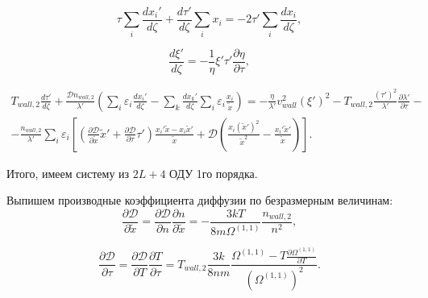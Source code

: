 \documentclass[12pt]{article}
\begin{document}
\begin{equation}
  \tau \sum_{i}\frac{d x_{i}'}{d \zeta} + \frac{d \tau'}{d \zeta}\sum_{i}x_{i} = -2\tau'\sum_{i}\frac{d x_{i}}{d \zeta},\label{eqn-d2x_i-sts-additional}
\end{equation}

\begin{equation}
  \frac{d \xi'}{d\zeta} = -\frac{1}{\eta} \xi' \tau' \frac{\partial \eta}{\partial \tau},\label{eqn-d2xi-sts}
\end{equation}

\begin{multline}
  T_{wall,2}\frac{d \tau'}{d \zeta} + \frac{\mathcal{D}n_{wall,2}}{\lambda'}\left(\sum_{i}\varepsilon_{i}\frac{d x_{i}'}{d\zeta} - \sum_{k}\frac{d x_{k}'}{d \zeta}\sum_{i}\varepsilon_{i}\frac{x_{i}}{\tilde{x}} \right) = 
   -\frac{\eta}{\lambda'} v_{wall}^2 \left(\xi' \right)^2 - T_{wall,2}\frac{\left(\tau'\right)^2}{\lambda'} \frac{\partial \lambda'}{\partial \tau} - \\
  - \frac{n_{wall,2}}{\lambda'}\sum_{i}\varepsilon_{i} \left[\left(\frac{\partial \mathcal{D}}{\partial \tilde{x}}\tilde{x}' + \frac{\partial \mathcal{D}}{\partial \tau}\tau' \right) \frac{x_{i}'\tilde{x} - x_{i}\tilde{x}'}{\tilde{x}} + \mathcal{D}\left(\frac{x_{i}\left(\tilde{x}'\right)^2}{\tilde{x}^2} - \frac{x_{i}'\tilde{x}'}{\tilde{x}} \right)  \right].\label{eqn-dtau-sts}
\end{multline}


Итого, имеем систему из $2L+4$ ОДУ 1го порядка.

Выпишем производные коэффициента диффузии по безразмерным величинам:
\begin{equation}
  \frac{\partial \mathcal{D}}{\partial \tilde{x}} = \frac{\partial \mathcal{D}}{\partial n}\frac{\partial n}{\partial \tilde{x}} = -\frac{3kT}{8m\Omega^{(1,1)}} \frac{n_{wall,2}}{n^2},
\end{equation}

\begin{equation}
  \frac{\partial \mathcal{D}}{\partial \tau} = \frac{\partial \mathcal{D}}{\partial T}\frac{\partial T}{\partial \tau} = T_{wall,2}\frac{3k}{8nm} \frac{\Omega^{(1,1)} - T \frac{\partial \Omega^{(1,1)}}{\partial T}}{\left(\Omega^{(1,1)}\right)^2}.
\end{equation}
\end{document}
